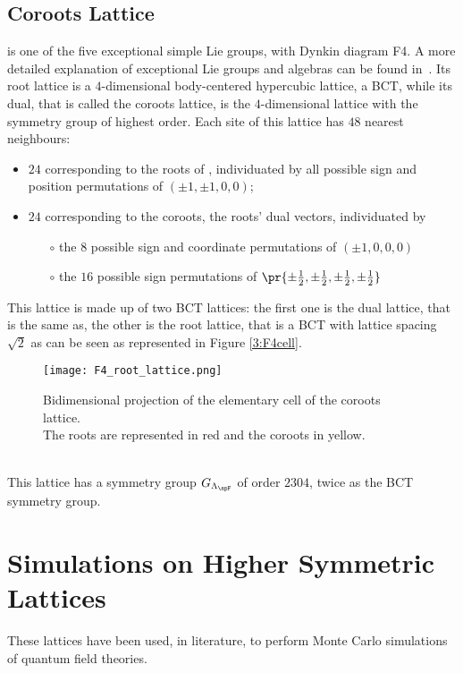 \subsection{\spFtext Coroots Lattice}
\spFtext is one of the five exceptional simple Lie groups, with Dynkin diagram \dynkin F4.
A more detailed explanation of exceptional Lie groups and algebras can be found in~\cite{adams1996lectures}.
Its root lattice is a $4$-dimensional body-centered hypercubic lattice, a BCT, while its dual, that is called the \spFtext coroots lattice, is the $4$-dimensional lattice with the symmetry group of highest order.
Each site of this lattice has $48$ nearest neighbours:
\begin{itemize}
    \item $24$ corresponding to the roots of \spFtext, individuated by all possible sign and position permutations of $(\pm1,\pm1,0,0)$;\
    \item $24$ corresponding to the coroots, the roots' dual vectors, individuated by\
    \begin{itemize}
        \item[$\circ$] the $8$ possible sign and coordinate permutations of $(\pm1,0,0,0)$\
        \item[$\circ$] the $16$ possible sign permutations of $\pr{\pm\frac12,\pm\frac12,\pm\frac12,\pm\frac12}$\
    \end{itemize}
\end{itemize}
This lattice is made up of two BCT lattices: the first one is the dual lattice, that is the same as, the other is the root lattice, that is a BCT with lattice spacing $\sqrt2$ as can be seen as represented in Figure \eqref{3:F4cell}.
\begin{figure}[!htbp]
    \centering
    \texttt{[image: F4\_root\_lattice.png]}
    \caption{Bidimensional projection of the elementary cell of the \spFtext coroots lattice.\\
             The roots are represented in red and the coroots in yellow.}
    \label{3:F4cell}
\end{figure}\\
This lattice has a symmetry group $G_{\Lambda_{\spF}}$ of order $2304$, twice as the BCT symmetry group.

\section{Simulations on Higher Symmetric Lattices}
These lattices have been used, in literature, to perform Monte Carlo simulations of quantum field theories.

